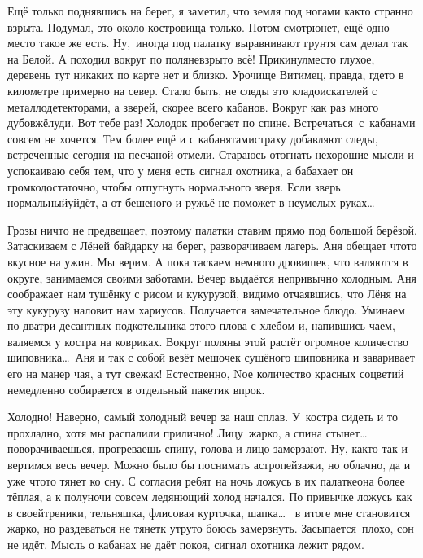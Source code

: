Ещё только поднявшись на берег, я заметил, что земля под ногами как\sdash то странно взрыта. Подумал, это около костровища только. Потом смотрю\mdash нет, ещё одно место такое же есть. Ну,~иногда под палатку выравнивают грунт\mdash я сам делал так на Белой. А походил вокруг по поляне\mdash взрыто всё! Прикинул\mdash место глухое, деревень тут никаких по карте нет и близко. Урочище Витимец, правда, где\sdash то в километре примерно на север. Стало быть, не следы это кладоискателей с металлодетекторами, а зверей, скорее всего кабанов. Вокруг как раз много дубов\mdash жёлуди. Вот тебе раз! Холодок пробегает по спине. Встречаться~с~кабанами совсем не хочется. Тем более ещё и с кабанятами\mdash страху добавляют следы, встреченные сегодня на песчаной отмели. Стараюсь отогнать нехорошие мысли и успокаиваю себя тем, что у меня есть сигнал охотника, а бабахает он громко\mdash достаточно, чтобы отпугнуть нормального зверя. Если зверь нормальный\mdash уйдёт, а от бешеного и ружьё не поможет в неумелых руках\ldots~ 

Грозы ничто не предвещает, поэтому палатки ставим прямо под большой берёзой. Затаскиваем с Лёней байдарку на берег, разворачиваем лагерь. Аня обещает что\sdash то вкусное на ужин. Мы верим. А пока таскаем немного дровишек, что валяются в округе, занимаемся своими заботами. Вечер выдаётся непривычно холодным. Аня соображает нам тушёнку с рисом и кукурузой, видимо отчаявшись, что Лёня на эту кукурузу наловит нам хариусов. Получается замечательное блюдо. Уминаем по два\sdash три десантных подкотельника этого плова с хлебом и, напившись чаем, валяемся у костра на ковриках. Вокруг поляны этой растёт огромное количество шиповника\ldots~Аня и так с собой везёт мешочек сушёного шиповника и заваривает его на манер чая, а тут свежак! Естественно, N\sdash ое количество красных соцветий немедленно собирается в отдельный пакетик впрок.

Холодно! Наверно, самый холодный вечер за наш сплав. У~костра сидеть и то прохладно, хотя мы распалили прилично! Лицу~жарко, а спина стынет\ldots~ поворачиваешься, прогреваешь спину, голова и лицо замерзают. Ну, как\sdash то так и вертимся весь вечер. Можно было бы поснимать астропейзажи, но облачно, да и уже что\sdash то тянет ко сну. С согласия ребят на ночь ложусь в их палатке\mdash она более тёплая, а к полуночи совсем ледянющий холод начался. По привычке ложусь как в своей\mdash треники, тельняшка, флисовая курточка, шапка\ldots~ в итоге мне становится жарко, но раздеваться не тянет\mdash к утру\sdash то боюсь замерзнуть. Засыпается~плохо, сон не идёт. Мысль о кабанах не даёт покоя, сигнал охотника лежит рядом. 

\begin{center}
\end{center}